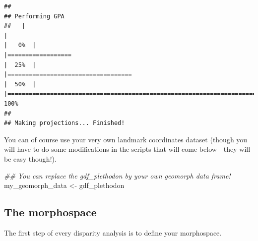 \documentclass[
]{book}
\newenvironment{Shaded}{\begin{snugshade}}{\end{snugshade}}
\newcommand{\CommentTok}[1]{\textcolor[rgb]{0.56,0.35,0.01}{\textit{#1}}}
\newcommand{\DataTypeTok}[1]{\textcolor[rgb]{0.13,0.29,0.53}{#1}}
\newcommand{\KeywordTok}[1]{\textcolor[rgb]{0.13,0.29,0.53}{\textbf{#1}}}
\newcommand{\NormalTok}[1]{#1}
\newcommand{\OperatorTok}[1]{\textcolor[rgb]{0.81,0.36,0.00}{\textbf{#1}}}
\newcommand{\StringTok}[1]{\textcolor[rgb]{0.31,0.60,0.02}{#1}}
\begin{document}
\begin{verbatim}
## 
## Performing GPA
##   |                                                                              |                                                                      |   0%  |                                                                              |==================                                                    |  25%  |                                                                              |===================================                                   |  50%  |                                                                              |======================================================================| 100%
## 
## Making projections... Finished!
\end{verbatim}

\begin{Shaded}
\end{Shaded}

You can of course use your very own landmark coordinates dataset (though you will have to do some modifications in the scripts that will come below - they will be easy though!).

\begin{Shaded}
\begin{Highlighting}[]
\CommentTok{\#\# You can replace the gdf\_plethodon by your own geomorph data frame!}
\NormalTok{my\_geomorph\_data \textless{}{-}}\StringTok{ }\NormalTok{gdf\_plethodon}
\end{Highlighting}
\end{Shaded}

\hypertarget{the-morphospace-1}{%
\subsection{The morphospace}\label{the-morphospace-1}}

The first step of every disparity analysis is to define your morphospace.
\end{document}
